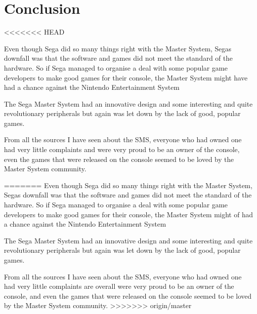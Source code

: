 \documentclass{scrartcl}
\begin{document}
\section{Conclusion}

<<<<<<< HEAD


Even though Sega did so many things right with the Master System, Segas downfall was that the software and games did not meet the standard of the hardware. So if Sega managed to organise a deal with some popular game developers to make good games for their console, the Master System might have had a chance against the Nintendo Entertainment System

The Sega Master System had an innovative design and some interesting and quite revolutionary peripherals but again was let down by the lack of good, popular games. 

From all the sources I have seen about the SMS, everyone who had owned one had very little complaints and were very proud to be an owner of the console, even the games that were released on the console seemed to be loved by the Master System community.

=======
Even though Sega did so many things right with the Master System, Segas downfall was that the software and games did not meet the standard of the hardware. So if Sega managed to organise a deal with some popular game developers to make good games for their console, the Master System might of had a chance against the Nintendo Entertainment System

The Sega Master System had an innovative design and some interesting and quite revolutionary peripherals but again was let down by the lack of good, popular games. 

From all the sources I have seen about the SMS, everyone who had owned one had very little complaints are overall were very proud to be an owner of the console, and even the games that were released on the console seemed to be loved by the Master System community. 
>>>>>>> origin/master




\end{document}
